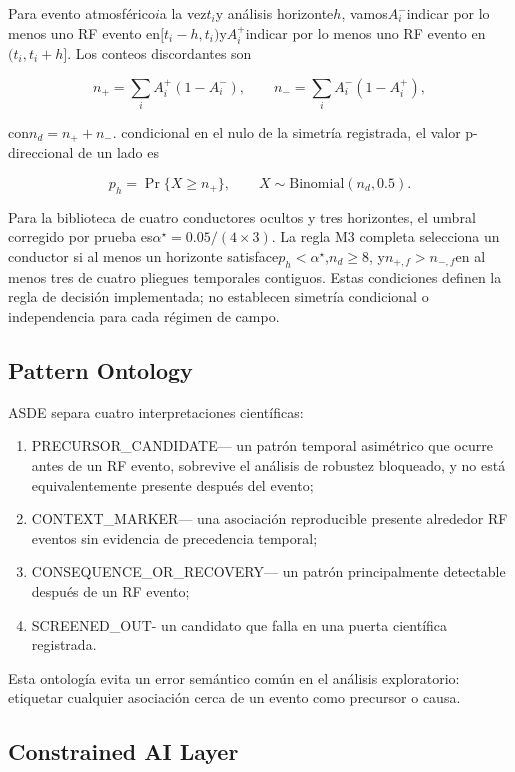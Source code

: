 \documentclass{ieeeaccess}
\providecommand{\tightlist}{\setlength{\itemsep}{0pt}\setlength{\parskip}{0pt}}
\begin{document}
Para evento atmosférico\(i\)a la vez\(t_i\)y análisis horizonte\(h\), vamos\(A_i^-\)indicar por lo menos uno RF evento en\([t_i-h,t_i)\)y\(A_i^+\)indicar por lo menos uno RF evento en\((t_i,t_i+h]\). Los conteos discordantes son

\[
n_{+}=\sum_i A_i^+(1-A_i^-), \qquad
n_{-}=\sum_i A_i^-(1-A_i^+),
\]

con\(n_d=n_{+}+n_{-}\). condicional en el nulo de la simetría registrada, el valor p-direccional de un lado es

\[
p_h=\Pr\{X\ge n_{+}\}, \qquad X\sim\mathrm{Binomial}(n_d,0.5).
\]

Para la biblioteca de cuatro conductores ocultos y tres horizontes, el umbral corregido por prueba es\(\alpha^\star=0.05/(4\times 3)\). La regla M3 completa selecciona un conductor si al menos un horizonte satisface\(p_h<\alpha^\star\),\(n_d\ge 8\), y\(n_{+,f}>n_{-,f}\)en al menos tres de cuatro pliegues temporales contiguos. Estas condiciones definen la regla de decisión implementada; no establecen simetría condicional o independencia para cada régimen de campo.

\subsection{Pattern Ontology}\label{pattern-ontology}

ASDE separa cuatro interpretaciones científicas:

\begin{enumerate}
\def\labelenumi{\arabic{enumi}.}
\tightlist
\item
  PRECURSOR\_CANDIDATE--- un patrón temporal asimétrico que ocurre antes de un RF evento, sobrevive el análisis de robustez bloqueado, y no está equivalentemente presente después del evento;
\item
  CONTEXT\_MARKER--- una asociación reproducible presente alrededor RF eventos sin evidencia de precedencia temporal;
\item
  CONSEQUENCE\_OR\_RECOVERY--- un patrón principalmente detectable después de un RF evento;
\item
  SCREENED\_OUT- un candidato que falla en una puerta científica registrada.
\end{enumerate}

Esta ontología evita un error semántico común en el análisis exploratorio: etiquetar cualquier asociación cerca de un evento como precursor o causa.

\subsection{Constrained AI Layer}\label{constrained-ai-layer}
\end{document}
